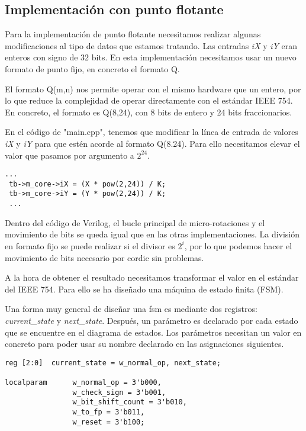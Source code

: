 \subsection{Implementación con punto flotante}
Para la implementación de punto flotante necesitamos realizar algunas modificaciones al tipo de datos que estamos tratando. Las entradas \textit{iX} y \textit{iY} eran enteros con signo de 32 bits. En esta implementación necesitamos usar un nuevo formato de punto fijo, en concreto el formato Q.

El formato Q(m,n) nos permite operar con el mismo hardware que un entero, por lo que reduce la complejidad de operar directamente con el estándar IEEE 754. En concreto, el formato es Q(8,24), con 8 bits de entero y 24 bits fraccionarios.

En el código de "main.cpp", tenemos que modificar la línea de entrada de valores \textit{iX} y \textit{iY} para que estén acorde al formato Q(8.24). Para ello necesitamos elevar el valor que pasamos por argumento a $2^{24}$.

\begin{lstlisting}[caption={Cambios de entrada de valores de C++ a Verilog en la implementación de Punto Flotante}]
 ...
 tb->m_core->iX = (X * pow(2,24)) / K;  
 tb->m_core->iY = (Y * pow(2,24)) / K;
 ...
\end{lstlisting}

Dentro del código de Verilog, el bucle principal de micro-rotaciones y el movimiento de bits se queda igual que en las otras implementaciones. La división en formato fijo se puede realizar si el divisor es $2^i$, por lo que podemos hacer el movimiento de bits necesario por \gls{cordic} sin problemas.

A la hora de obtener el resultado necesitamos transformar el valor en el estándar del IEEE 754. Para ello se ha diseñado una máquina de estado finita (FSM).

Una forma muy general de diseñar una \gls{fsm} es mediante dos registros: \textit{current\_state} y \textit{next\_state}. Después, un parámetro es declarado por cada estado que se encuentre en el diagrama de estados. Los parámetros necesitan un valor en concreto para poder usar su nombre declarado en las asignaciones siguientes.

\begin{lstlisting}[caption={Registros para controlar los estádos y parámetros locales de estado para controlar la máquina de estado finita.}]
reg [2:0]  current_state = w_normal_op, next_state;

localparam      w_normal_op = 3'b000,
                w_check_sign = 3'b001,
                w_bit_shift_count = 3'b010,
                w_to_fp = 3'b011,
                w_reset = 3'b100;

\end{lstlisting}

